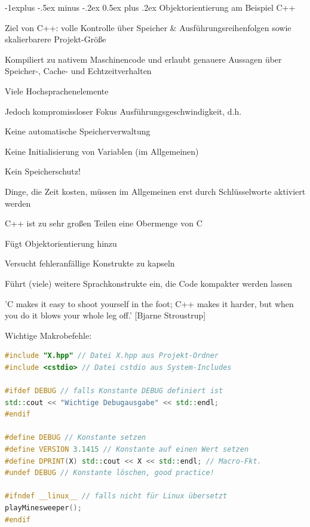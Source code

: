 \documentclass[10pt]{article}
\makeatletter
\renewcommand{\subsection}{\@startsection{subsection}{2}{0mm}%
                                {-1explus -.5ex minus -.2ex}%
                                {0.5ex plus .2ex}%
                                {\normalfont\normalsize\bfseries}}
\makeatother
\begin{document}
\subsection{Objektorientierung am Beispiel C++}
\begin{itemize*}
  \item Ziel von C++: volle Kontrolle über Speicher \& Ausführungsreihenfolgen sowie skalierbarere Projekt-Größe
  \item Kompiliert zu nativem Maschinencode und erlaubt genauere Aussagen über Speicher-, Cache- und Echtzeitverhalten
  \item Viele Hochsprachenelemente
  \item Jedoch kompromissloser Fokus Ausführungsgeschwindigkeit, d.h.
  \begin{itemize*}
    \item Keine automatische Speicherverwaltung
    \item Keine Initialisierung von Variablen (im Allgemeinen)
    \item Kein Speicherschutz!
    \item Dinge, die Zeit kosten, müssen im Allgemeinen erst durch Schlüsselworte aktiviert werden
  \end{itemize*}
  \item C++ ist zu sehr großen Teilen eine Obermenge von C
  \begin{itemize*}
    \item Fügt Objektorientierung hinzu
    \item Versucht fehleranfällige Konstrukte zu kapseln
    \item Führt (viele) weitere Sprachkonstrukte ein, die Code kompakter werden lassen
  \end{itemize*}
\end{itemize*}

'C makes it easy to shoot yourself in the foot; C++ makes it harder, but when you do it blows your whole leg off.' [Bjarne Stroustrup]

Wichtige Makrobefehle:
\begin{lstlisting}[language=C++]
#include "X.hpp" // Datei X.hpp aus Projekt-Ordner
#include <cstdio> // Datei cstdio aus System-Includes

#ifdef DEBUG // falls Konstante DEBUG definiert ist
std::cout << "Wichtige Debugausgabe" << std::endl;
#endif

#define DEBUG // Konstante setzen
#define VERSION 3.1415 // Konstante auf einen Wert setzen
#define DPRINT(X) std::cout << X << std::endl; // Macro-Fkt.
#undef DEBUG // Konstante löschen, good practice!

#ifndef __linux__ // falls nicht für Linux übersetzt
playMinesweeper();
#endif
\end{lstlisting}
\end{document}
